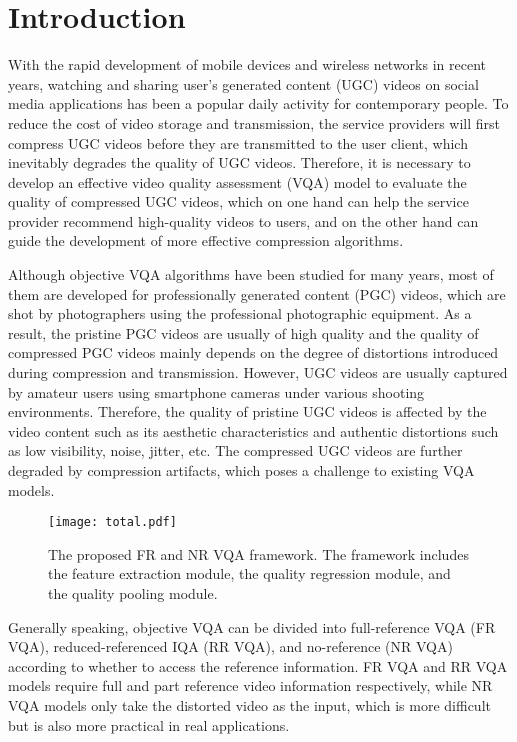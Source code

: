 \documentclass{article}
\begin{document}
\section{Introduction}
\label{sec:intro}

With the rapid development of mobile devices and wireless networks in recent years, watching and sharing user's generated content (UGC) videos on social media applications has been a popular daily activity for contemporary people. To reduce the cost of video storage and transmission, the service providers will first compress UGC videos before they are transmitted to the user client, which inevitably degrades the quality of UGC videos. Therefore, it is necessary to develop an effective video quality assessment (VQA) model to evaluate the quality of compressed UGC videos, which on one hand can help the service provider recommend high-quality videos to users, and on the other hand can guide the development of more effective compression algorithms.

Although objective VQA algorithms have been studied for many years, most of them are developed for professionally generated content (PGC) videos, which are shot by photographers using the professional photographic equipment. As a result, the pristine PGC videos are usually of high quality and the quality of compressed PGC videos mainly depends on the degree of distortions introduced during compression and transmission. However, UGC videos are usually captured by amateur users using smartphone cameras under various shooting environments. Therefore, the quality of pristine UGC videos is affected by the video content such as its aesthetic characteristics and authentic distortions such as low visibility, noise, jitter, etc. The compressed UGC videos are further degraded by compression artifacts, which poses a challenge to existing VQA models.

\begin{figure*}[!t]
	\centering
	\texttt{[image: total.pdf]}
	\caption{The proposed FR and NR VQA framework. The framework includes the feature extraction module, the quality regression module, and the quality pooling module.}
	\label{framework}
	\vspace{-0.3cm}
\end{figure*}

Generally speaking, objective VQA can be divided into full-reference VQA (FR VQA), reduced-referenced IQA (RR VQA), and no-reference (NR VQA) according to whether to access the reference information. FR VQA and RR VQA models require full and part reference video information respectively, while NR VQA models only take the distorted video as the input, which is more difficult but is also more practical in real applications.
\end{document}
